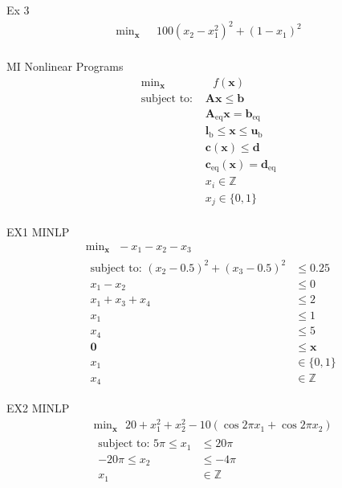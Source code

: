 \documentclass{article}
\begin{document}
Ex 3
\begin{align*}
    \text{min}_{\mathbf{x}}& \text{ } 100(x_2 - x_1^2)^2 + (1 - x_1)^2 \\
\end{align*}

MI Nonlinear Programs
\begin{align*}
    \text{min}_{\mathbf{x}}& \text{ } f\left(\mathbf{x}\right) \\
    \mbox{subject to: }& \mathbf{A}\mathbf{x} \le \mathbf{b}\\
                       & \mathbf{A}_{\text{eq}}\mathbf{x} = \mathbf{b}_{\text{eq}}\\
                       & \mathbf{l}_{\text{b}} \le \mathbf{x} \le \mathbf{u}_{\text{b}}\\
                       & \mathbf{c}\left(\mathbf{x}\right) \le \mathbf{d}\\
                       & \mathbf{c}_{\text{eq}}\left(\mathbf{x}\right) = \mathbf{d}_{\text{eq}}\\
                       & x_i \in \mathbb{Z}\\
                       & x_j \in \{0,1\}\\
\end{align*}

EX1 MINLP
\begin{align*}
    &\text{min}_{\mathbf{x}} \text{ } -x_1 - x_2 - x_3 \\
    &\begin{aligned}
    \mbox{subject to: }  (x_2 - 0.5)^2 + (x_3 - 0.5)^2 &\le 0.25\\
                         x_1 - x_2 &\le 0\\
                         x_1 + x_3 + x_4 &\le 2\\
                         x_1 &\le 1\\
                         x_4 &\le 5\\
                         \mathbf{0} &\le \mathbf{x}\\
                         x_1 &\in \{0,1\}\\
                         x_4 &\in \mathbb{Z}
    \end{aligned}
\end{align*}

EX2 MINLP
\begin{align*}
    &\text{min}_{\mathbf{x}} \text{ } 20 + x_1^2 + x_2^2 - 10(\cos2\pi x_1 + \cos2\pi x_2) \\
    &\begin{aligned}
    \mbox{subject to: }  5\pi \le x_1 &\le 20\pi\\
                         -20\pi \le x_2 &\le -4\pi\\
                         x_1 &\in \mathbb{Z}
    \end{aligned}
\end{align*}
\end{document}

